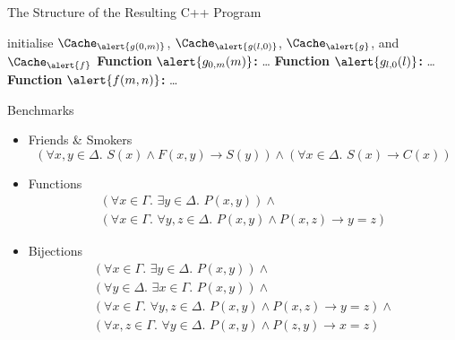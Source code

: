 \documentclass{beamer}
\begin{document}
\begin{frame}{The Structure of the Resulting C++ Program}
  \begin{algorithm}[H]
    initialise $\Cache_{\alert{g(0, m)}}$, $\Cache_{\alert{g(l, 0)}}$, $\Cache_{\alert{g}}$, and $\Cache_{\alert{f}}$\; \DontPrintSemicolon\pause
    \textbf{Function} $\alert{g_{0,m}(m)}$\textbf{:} \dots\;
    \textbf{Function} $\alert{g_{l,0}(l)}$\textbf{:} \dots\; \PrintSemicolon\pause
     \DontPrintSemicolon
    \textbf{Function} $\alert{f(m, n)}$\textbf{:} \dots\; \PrintSemicolon
  \end{algorithm}
\end{frame}

\begin{frame}{Benchmarks}
  \begin{itemize}
    \item Friends \& Smokers
          \[
          (\forall x,y \in \Delta\text{.
          } S(x) \land F(x, y) \to S(y)) \land (\forall x \in \Delta\text{.
          }S(x) \to C(x))
          \]
          \pause
    \item Functions
          \begin{gather*}
            (\forall x \in \Gamma\text{. }\exists y \in \Delta\text{. }P(x, y)) \land{}\\
            (\forall x \in \Gamma\text{. }\forall y, z \in \Delta\text{. }P(x, y) \land P(x, z) \to y = z)
          \end{gather*}
          \pause
    \item Bijections
          \begin{gather*}
            (\forall x \in \Gamma\text{. }\exists y \in \Delta\text{. }P(x, y))\land{}\\
            (\forall y \in \Delta\text{. }\exists x \in \Gamma\text{. }P(x, y))\land{}\\
            (\forall x \in \Gamma\text{. }\forall y, z \in \Delta\text{. }P(x, y) \land P(x, z) \to y = z)\land{}\\
            (\forall x, z \in \Gamma\text{. }\forall y \in \Delta\text{. }P(x, y) \land P(z, y) \to x = z)
          \end{gather*}
  \end{itemize}
\end{frame}
\end{document}
